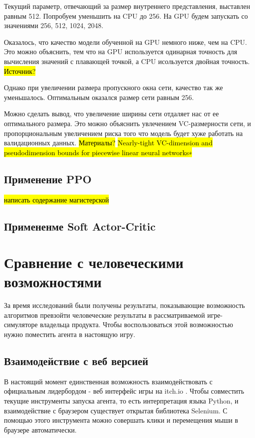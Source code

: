 \documentclass{article}
\begin{document}
Текущий параметр, отвечающий за размер внутреннего представления, выставлен равным 512.
Попробуем уменьшить на CPU до 256.
На GPU будем запускать со значениями 256, 512, 1024, 2048.

Оказалось, что качество модели обученной на GPU немного ниже, чем на CPU.
Это можно объяснить, тем что на GPU используется одинарная точность для вычисления значений с плавающей точкой, а CPU исользуется двойная точность.
\hl{Источник?}

Однако при увеличении размера пропускного окна сети, качество так же уменьшалось.
Оптимальным оказался размер сети равным 256.

Можно сделать вывод, что увеличение ширины сети отдаляет нас от ее оптимального размера.
Это можно объяснить увлечением VC-размерности сети, и пропорциональным увеличением риска того что модель будет хуже работать на валидационных данных.
\hl{Материалы?}
\hl{Nearly-tight VC-dimension and pseudodimension bounds
for piecewise linear neural networks∗}

\subsection{Применение PPO}

\hl{написать содержание магистерской}

\subsection{Примененме Soft Actor-Critic}

\section{Сравнение с человеческими возможностями}

За время исследований были получены результаты, показывающие возможность алгоритмов превзойти человеческие результаты в рассматриваемой игре-симуляторе владельца продукта.
Чтобы воспользоваться этой возможностью нужно поместить агента в настоящую игру.

\subsection{Взаимодействие с веб версией}

В настоящий момент единственная возможность взаимодействовать с официальным лидербордом - веб интерфейс игры на itch.io .
Чтобы совместить текущие инструменты запуска агента, то есть интерпретация языка Python, и взаимодействие с браузером существует открытая библиотека Selenium.
С помощью этого инструмента можно совершать клики и перемещения мыши в браузере автоматически.
\end{document}
